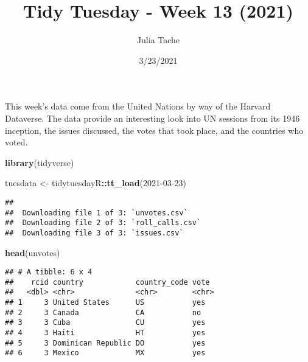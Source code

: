 \documentclass[
]{article}
\title{Tidy Tuesday - Week 13 (2021)}
\author{Julia Tache}
\date{3/23/2021}
\newenvironment{Shaded}{\begin{snugshade}}{\end{snugshade}}
\newcommand{\KeywordTok}[1]{\textcolor[rgb]{0.13,0.29,0.53}{\textbf{#1}}}
\newcommand{\NormalTok}[1]{#1}
\newcommand{\OperatorTok}[1]{\textcolor[rgb]{0.81,0.36,0.00}{\textbf{#1}}}
\newcommand{\StringTok}[1]{\textcolor[rgb]{0.31,0.60,0.02}{#1}}
\begin{document}
\maketitle

This week's data come from the United Nations by way of the Harvard
Dataverse. The data provide an interesting look into UN sessions from
its 1946 inception, the issues discussed, the votes that took place, and
the countries who voted.

\begin{Shaded}
\begin{Highlighting}[]
\KeywordTok{library}\NormalTok{(tidyverse)}

\NormalTok{tuesdata \textless{}{-}}\StringTok{ }\NormalTok{tidytuesdayR}\OperatorTok{::}\KeywordTok{tt\_load}\NormalTok{(}\StringTok{\textquotesingle{}2021{-}03{-}23\textquotesingle{}}\NormalTok{)}
\end{Highlighting}
\end{Shaded}

\begin{verbatim}
## 
##  Downloading file 1 of 3: `unvotes.csv`
##  Downloading file 2 of 3: `roll_calls.csv`
##  Downloading file 3 of 3: `issues.csv`
\end{verbatim}

\begin{Shaded}
\end{Shaded}

\begin{Shaded}
\begin{Highlighting}[]
\KeywordTok{head}\NormalTok{(unvotes)}
\end{Highlighting}
\end{Shaded}

\begin{verbatim}
## # A tibble: 6 x 4
##    rcid country            country_code vote 
##   <dbl> <chr>              <chr>        <chr>
## 1     3 United States      US           yes  
## 2     3 Canada             CA           no   
## 3     3 Cuba               CU           yes  
## 4     3 Haiti              HT           yes  
## 5     3 Dominican Republic DO           yes  
## 6     3 Mexico             MX           yes
\end{verbatim}
\end{document}
